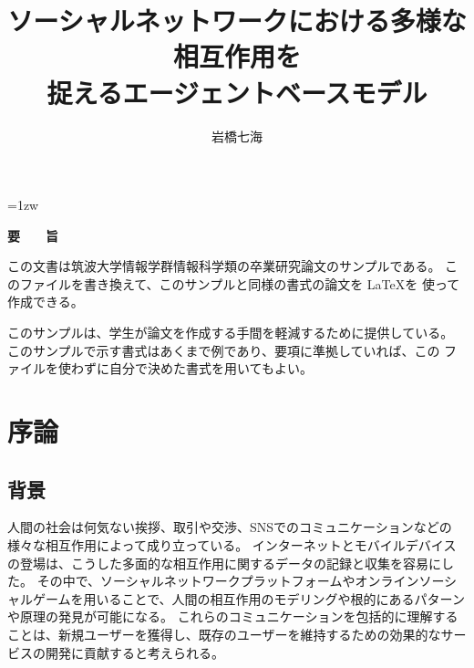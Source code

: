 \documentclass[uplatex,11pt,openany]{ujreport}
\title{ソーシャルネットワークにおける多様な相互作用を\\捉えるエージェントベースモデル}
\author{岩橋七海}
\begin{document}
\maketitle
\thispagestyle{empty}
\newpage

\thispagestyle{empty}
\vspace*{20pt plus 1fil}
\parindent=1zw
\noindent
\begin{center}
{\Large \bf 要　　旨}
\vspace{2cm}
\end{center}
この文書は筑波大学情報学群情報科学類の卒業研究論文のサンプルである。
このファイルを書き換えて、このサンプルと同様の書式の論文を \LaTeX を
使って作成できる。

このサンプルは、学生が論文を作成する手間を軽減するために提供している。
このサンプルで示す書式はあくまで例であり、要項に準拠していれば、この
ファイルを使わずに自分で決めた書式を用いてもよい。

\par
\vspace{0pt plus 1fil}
\newpage

\tableofcontents
\listoffigures

\pagebreak \setcounter{page}{1}

\chapter{序論}
    \section{背景}
    人間の社会は何気ない挨拶、取引や交渉、SNSでのコミュニケーションなどの様々な相互作用によって成り立っている。
    インターネットとモバイルデバイスの登場は、こうした多面的な相互作用に関するデータの記録と収集を容易にした。
    その中で、ソーシャルネットワークプラットフォームやオンラインソーシャルゲームを用いることで、人間の相互作用のモデリングや根的にあるパターンや原理の発見が可能になる。
    これらのコミュニケーションを包括的に理解することは、新規ユーザーを獲得し、既存のユーザーを維持するための効果的なサービスの開発に貢献すると考えられる。
\end{document}

